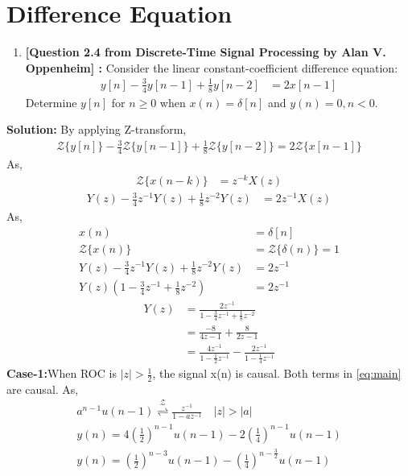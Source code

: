 \documentclass[journal,12pt,twocolumn]{IEEEtran}
\newcommand{\solution}{\noindent \textbf{Solution: }}
\providecommand{\brak}[1]{\ensuremath{\left(#1\right)}}
\providecommand{\sbrak}[1]{\ensuremath{\left[#1\right]}}
\providecommand{\abs}[1]{\left\vert#1\right\vert}
\providecommand{\ztrans}{\overset{\mathcal{Z}}{ \rightleftharpoons}}
\numberwithin{equation}{section}
\renewcommand\thesection{\arabic{section}}
\begin{document}
 \section{Difference Equation}
  \begin{enumerate}[label=\thesection.\arabic*]
\item \textbf{[Question 2.4 from Discrete-Time Signal Processing by Alan V. Oppenheim] : }Consider the linear constant-coefficient difference equation:
\begin{align}
y\sbrak{n}-\frac{3}{4}y\sbrak{n-1}+\frac{1}{8}y\sbrak{n-2}&=2x\sbrak{n-1}
\end{align}
Determine $y\sbrak{n}$ for $n\ge 0 $ when $x\brak{n}=\delta \sbrak{n}$ and $y\brak{n}=0,n<0$.
\end{enumerate}
\solution By applying Z-transform,
\begin{align}
{\mathcal {Z}}\{y\sbrak{n}\}-\frac{3}{4}{\mathcal {Z}}\{y\sbrak{n-1}\}+\frac{1}{8}{\mathcal {Z}}\{y\sbrak{n-2}\}=2{\mathcal {Z}}\{x\sbrak{n-1}\}
\end{align}
As,
\begin{align}
\label{eq:z-trans-prop}
	{\mathcal {Z}}\{x(n-k)\} &= z^{-k}X(z)
\end{align}
\begin{align}
Y(z)-\frac{3}{4}z^{-1}Y(z)+\frac{1}{8}z^{-2}Y(z)&=2z^{-1}X(z)
\end{align}
As,
\begin{align}
x\brak{n}&=\delta \sbrak{n} \\
{\mathcal {Z}}\{x(n)\}&={\mathcal {Z}}\{\delta(n)\}=1\\
Y(z)-\frac{3}{4}z^{-1}Y(z)+\frac{1}{8}z^{-2}Y(z)&=2z^{-1}\\
Y(z)(1-\frac{3}{4}z^{-1}+\frac{1}{8}z^{-2})&=2z^{-1}
\end{align}
\begin{align}
Y(z)&=\frac{2z^{-1}}{1-\frac{3}{4}z^{-1}+\frac{1}{8}z^{-2}}\\
&=\frac{-8}{4z-1}+\frac{8}{2z-1}\\
\label{eq:main}
&=\frac{4z^{-1}}{1-\frac{1}{2}z^{-1}}-\frac{2z^{-1}}{1-\frac{1}{4}z^{-1}}
\end{align}
\textbf{Case-1:}When ROC is $\abs{z}>\frac{1}{2}$, the signal x(n) is causal. Both terms in \eqref{eq:main} are causal.
As,
\begin{align}
\label{eq:anti}
a^{n-1}u(n-1) \ztrans \frac{z^{-1}}{1-az^{-1}} \quad \abs{z} > \abs{a}\\
y(n)=4\brak{\frac{1}{2}}^{n-1}u(n-1)-2\brak{\frac{1}{4}}^{n-1}u(n-1)\\
y(n)=\brak{\frac{1}{2}}^{n-3}u(n-1)-\brak{\frac{1}{4}}^{n-\frac{3}{2}}u(n-1)
\end{align}
\end{document}
